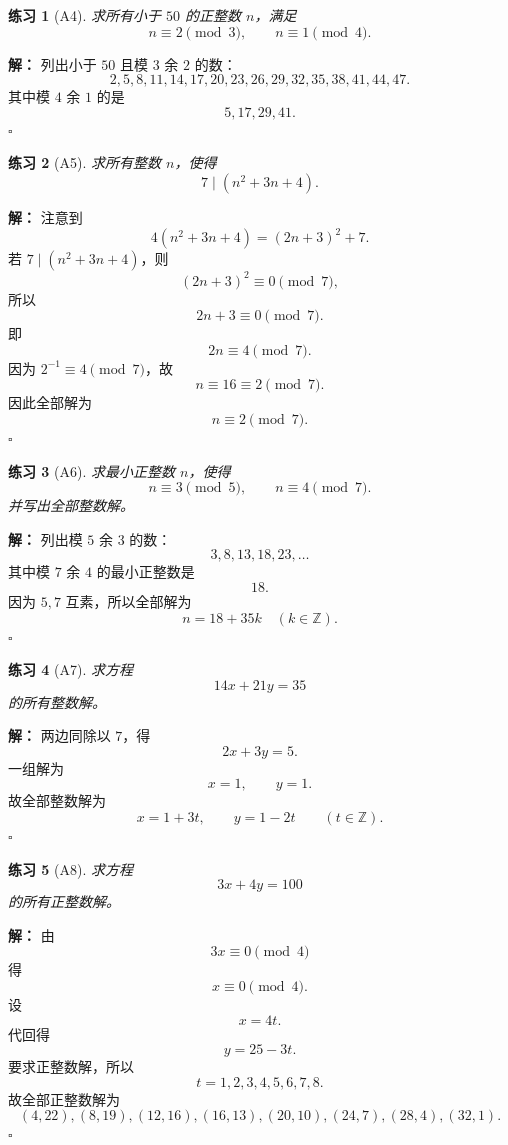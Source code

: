 \documentclass[11pt,a4paper,fontset=fandol]{ctexart}
\theoremstyle{formaltheorem}
\theoremstyle{formalexample}
\newtheorem{exercise}{练习}[section]
\newenvironment{solution}{\par\noindent\textbf{解：}}{\hfill$\square$\par}
\begin{document}
\begin{exercise}[A4]
求所有小于 $50$ 的正整数 $n$，满足
\[
n\equiv 2\pmod 3,\qquad n\equiv 1\pmod 4.
\]
\end{exercise}

\begin{solution}
列出小于 $50$ 且模 $3$ 余 $2$ 的数：
\[
2,5,8,11,14,17,20,23,26,29,32,35,38,41,44,47.
\]
其中模 $4$ 余 $1$ 的是
\[
\boxed{5,17,29,41}.
\]
\end{solution}

\begin{exercise}[A5]
求所有整数 $n$，使得
\[
7\mid (n^2+3n+4).
\]
\end{exercise}

\begin{solution}
注意到
\[
4(n^2+3n+4)=(2n+3)^2+7.
\]
若 $7\mid (n^2+3n+4)$，则
\[
(2n+3)^2\equiv 0\pmod 7,
\]
所以
\[
2n+3\equiv 0\pmod 7.
\]
即
\[
2n\equiv 4\pmod 7.
\]
因为 $2^{-1}\equiv 4\pmod 7$，故
\[
n\equiv 16\equiv 2\pmod 7.
\]
因此全部解为
\[
\boxed{n\equiv 2\pmod 7}.
\]
\end{solution}

\begin{exercise}[A6]
求最小正整数 $n$，使得
\[
n\equiv 3\pmod 5,\qquad n\equiv 4\pmod 7.
\]
并写出全部整数解。
\end{exercise}

\begin{solution}
列出模 $5$ 余 $3$ 的数：
\[
3,8,13,18,23,\dots
\]
其中模 $7$ 余 $4$ 的最小正整数是
\[
\boxed{18}.
\]
因为 $5,7$ 互素，所以全部解为
\[
\boxed{n=18+35k\quad (k\in \mathbb{Z})}.
\]
\end{solution}

\begin{exercise}[A7]
求方程
\[
14x+21y=35
\]
的所有整数解。
\end{exercise}

\begin{solution}
两边同除以 $7$，得
\[
2x+3y=5.
\]
一组解为
\[
x=1,\qquad y=1.
\]
故全部整数解为
\[
\boxed{x=1+3t,\qquad y=1-2t\qquad (t\in \mathbb{Z})}.
\]
\end{solution}

\begin{exercise}[A8]
求方程
\[
3x+4y=100
\]
的所有正整数解。
\end{exercise}

\begin{solution}
由
\[
3x\equiv 0\pmod 4
\]
得
\[
x\equiv 0\pmod 4.
\]
设
\[
x=4t.
\]
代回得
\[
y=25-3t.
\]
要求正整数解，所以
\[
t=1,2,3,4,5,6,7,8.
\]
故全部正整数解为
\[
\boxed{(4,22),(8,19),(12,16),(16,13),(20,10),(24,7),(28,4),(32,1)}.
\]
\end{solution}
\end{document}
